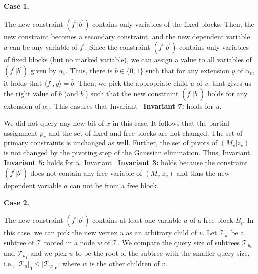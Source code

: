 \documentclass[10pt,a4paper]{article}
\begin{document}
\par\medskip\noindent\textbf{Case 1.}\par




The new constraint $(f^{\prime}|b^{\prime})$ contains only variables of the fixed blocks.
Then, the new constraint becomes a secondary constraint, and the new dependent variable $a$ can be any variable of $f^{\prime}$.
Since the constraint $(f^{\prime}|b^{\prime})$ contains only variables of fixed blocks (but no marked variable), we can assign a value to all variables of $(f^{\prime}|b^{\prime})$ given by $\alpha_{v}$.
Thus, there is $\bar{b}\in\{0,1\}$ such that for any extension $y$ of $\alpha_{v}$, it holds that $\langle f^{\prime},y\rangle=\bar{b}$.
Then, we pick the appropriate child $u$ of $v$, that gives us the right value of $b$ (and $b^{\prime}$) such that the new constraint $(f^{\prime}|b^{\prime})$ holds for any extension of $\alpha_{v}$. This ensures that Invariant \textbf{ Invariant 7:} holds for $u$.\par




We did not query any new bit of $x$ in this case.
It follows that the partial assignment $\rho_{v}$ and the set of fixed and free blocks are not changed.
The set of primary constraints is unchanged as well.
Further, the set of pivots of $(M_{v}|z_{v})$ is not changed by the pivoting step of the Gaussian elimination.
Thus, Invariant \textbf{ Invariant 5:} holds for $u$.
Invariant \textbf{ Invariant 3:} holds because the constraint $(f^{\prime}|b^{\prime})$ does not contain any free variable of $(M_{v}|z_{v})$ and thus the new dependent variable $a$ can not be from a free block.\par





\par\medskip\noindent\textbf{Case 2.}\par




The new constraint $(f^{\prime}|b^{\prime})$ contains at least one variable $a$ of a free block $B_{i}$.
In this case, we can pick the new vertex $u$ as an arbitrary child of $v$.
Let $\mathcal{T}_{w}$ be a subtree of $\mathcal{T}$ rooted in a node $w$ of $\mathcal{T}$.
We compare the query size of subtrees $\mathcal{T}_{u_{0}}$ and $\mathcal{T}_{u_{1}}$ and we pick $u$ to be the root of the subtree with the smaller query size, i.e., $|\mathcal{T}_{u}|_{\mathsf{q}}\leq|\mathcal{T}_{w}|_{\mathsf{q}}$, where $w$ is the other children of $v$.\par
\end{document}
